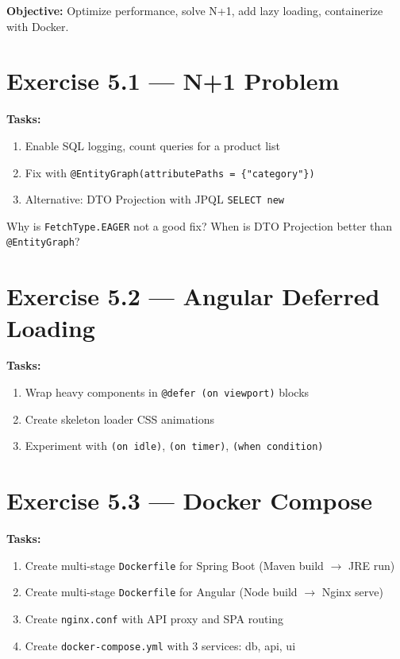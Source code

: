 \documentclass[12pt,a4paper]{report}
\begin{document}
\textbf{Objective:} Optimize performance, solve N+1, add lazy loading, containerize with Docker.

\section{Exercise 5.1 --- N+1 Problem}

\textbf{Tasks:}
\begin{enumerate}
    \item Enable SQL logging, count queries for a product list
    \item Fix with \texttt{@EntityGraph(attributePaths = \{"category"\})}
    \item Alternative: DTO Projection with JPQL \texttt{SELECT new}
\end{enumerate}

\begin{thinkbox}
Why is \texttt{FetchType.EAGER} not a good fix? When is DTO Projection better than \texttt{@EntityGraph}?
\end{thinkbox}

\section{Exercise 5.2 --- Angular Deferred Loading}

\textbf{Tasks:}
\begin{enumerate}
    \item Wrap heavy components in \texttt{@defer (on viewport)} blocks
    \item Create skeleton loader CSS animations
    \item Experiment with \texttt{(on idle)}, \texttt{(on timer)}, \texttt{(when condition)}
\end{enumerate}

\section{Exercise 5.3 --- Docker Compose}

\textbf{Tasks:}
\begin{enumerate}
    \item Create multi-stage \texttt{Dockerfile} for Spring Boot (Maven build $\to$ JRE run)
    \item Create multi-stage \texttt{Dockerfile} for Angular (Node build $\to$ Nginx serve)
    \item Create \texttt{nginx.conf} with API proxy and SPA routing
    \item Create \texttt{docker-compose.yml} with 3 services: db, api, ui
\end{enumerate}
\end{document}
